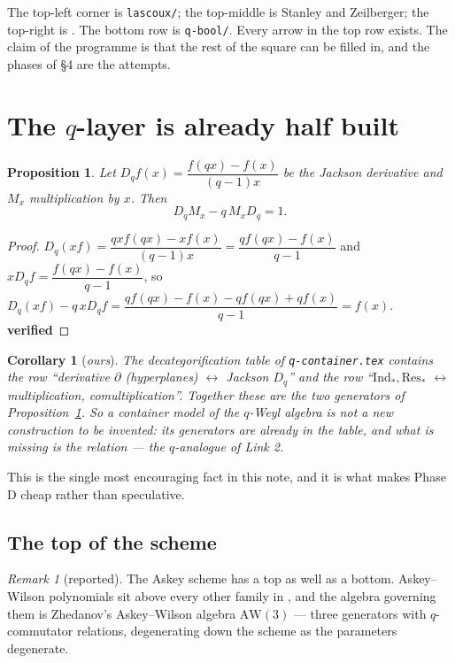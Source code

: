 \documentclass[11pt,a4paper]{article}
\newtheorem{proposition}[theorem]{Proposition}
\newtheorem{corollary}[theorem]{Corollary}
\theoremstyle{definition}
\theoremstyle{remark}
\newtheorem{remark}[theorem]{Remark}
\newcommand{\AW}{\mathrm{AW}(3)}
\newcommand{\OK}{\textcolor{okgreen}{\textbf{verified}}}
\begin{document}
\noindent
The top-left corner is \texttt{lascoux/}; the top-middle is Stanley and Zeilberger; the
top-right is \cite{AAR}. The bottom row is \texttt{q-bool/}. Every arrow in the top row
exists. The claim of the programme is that the rest of the square can be filled in, and
the phases of \S4 are the attempts.

\section{The $q$-layer is already half built}

\begin{proposition}\label{prop:qweyl}
Let $D_q f(x) = \dfrac{f(qx) - f(x)}{(q-1)x}$ be the Jackson derivative and $M_x$
multiplication by $x$. Then
\[
  D_q M_x - q\, M_x D_q = 1 .
\]
\end{proposition}

\begin{proof}
$D_q(xf) = \dfrac{qx f(qx) - x f(x)}{(q-1)x} = \dfrac{q f(qx) - f(x)}{q-1}$ and
$x D_q f = \dfrac{f(qx)-f(x)}{q-1}$, so
$D_q(xf) - q\,x D_q f = \dfrac{q f(qx) - f(x) - q f(qx) + q f(x)}{q-1} = f(x)$. \OK
\end{proof}

\begin{corollary}[\emph{ours}]\label{cor:jackson-row}
The decategorification table of \texttt{q-container.tex} contains the row
``derivative $\partial$ (hyperplanes) $\leftrightarrow$ Jackson $D_q$'' and the row
``$\mathrm{Ind}_*,\mathrm{Res}_*$ $\leftrightarrow$ multiplication, comultiplication''.
Together these are the two generators of Proposition~\ref{prop:qweyl}. So a container
model of the $q$-Weyl algebra is not a new construction to be invented: its generators
are already in the table, and what is missing is the \emph{relation} --- the
$q$-analogue of Link 2.
\end{corollary}

This is the single most encouraging fact in this note, and it is what makes Phase D
cheap rather than speculative.

\subsection{The top of the scheme}

\begin{remark}[reported]\label{rem:AW}
The Askey scheme has a top as well as a bottom. Askey--Wilson polynomials sit above
every other family in \cite{KLS}, and the algebra governing them is Zhedanov's
Askey--Wilson algebra $\AW$ \cite{Zhedanov,Terwilliger} --- three generators with
$q$-commutator relations, degenerating down the scheme as the parameters degenerate.
\end{remark}
\end{document}
